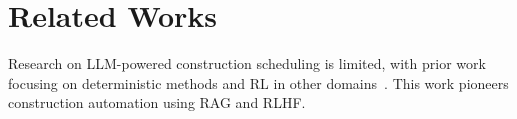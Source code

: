\section{Related Works}
Research on LLM-powered construction scheduling is limited, with prior work focusing on deterministic methods and RL in other domains~\cite{srivastava2022imperative,dashti2021integrated,bademosi2021factors,pan2021automated,li2021optimal}. This work pioneers construction automation using RAG and RLHF.

%